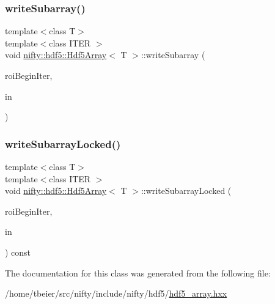 \mbox{\label{classnifty_1_1hdf5_1_1Hdf5Array_af6773c766d8f098f715e74de486df0af}} 
\subsubsection{\texorpdfstring{write\+Subarray()}{writeSubarray()}}
{\footnotesize\ttfamily template$<$class T$>$ \\
template$<$class I\+T\+ER $>$ \\
void \hyperlink{classnifty_1_1hdf5_1_1Hdf5Array}{nifty\+::hdf5\+::\+Hdf5\+Array}$<$ T $>$\+::write\+Subarray (\begin{DoxyParamCaption}\item[{I\+T\+ER}]{roi\+Begin\+Iter,  }\item[{const \hyperlink{classandres_1_1View}{marray\+::\+View}$<$ T $>$ \&}]{in }\end{DoxyParamCaption})\hspace{0.3cm}{\ttfamily [inline]}}

\mbox{\label{classnifty_1_1hdf5_1_1Hdf5Array_a858b48f56fcc9d439d0d86fd2846f05d}} 
\subsubsection{\texorpdfstring{write\+Subarray\+Locked()}{writeSubarrayLocked()}}
{\footnotesize\ttfamily template$<$class T$>$ \\
template$<$class I\+T\+ER $>$ \\
void \hyperlink{classnifty_1_1hdf5_1_1Hdf5Array}{nifty\+::hdf5\+::\+Hdf5\+Array}$<$ T $>$\+::write\+Subarray\+Locked (\begin{DoxyParamCaption}\item[{I\+T\+ER}]{roi\+Begin\+Iter,  }\item[{const \hyperlink{classandres_1_1View}{marray\+::\+View}$<$ T $>$ \&}]{in }\end{DoxyParamCaption}) const\hspace{0.3cm}{\ttfamily [inline]}}



The documentation for this class was generated from the following file\+:\begin{DoxyCompactItemize}
\item 
/home/tbeier/src/nifty/include/nifty/hdf5/\hyperlink{hdf5__array_8hxx}{hdf5\+\_\+array.\+hxx}\end{DoxyCompactItemize}
